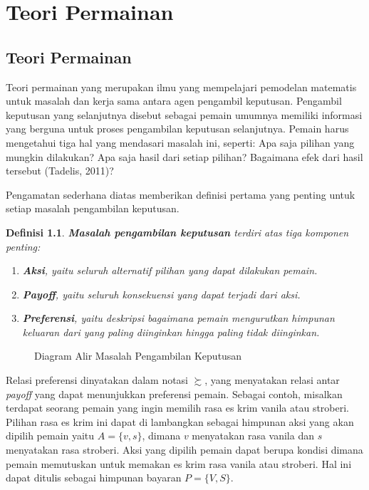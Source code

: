 \newtheorem{definisi}{Definisi}

\chapter{Teori Permainan}
\section{Teori Permainan}
Teori permainan yang merupakan ilmu yang mempelajari pemodelan matematis untuk masalah dan kerja sama antara agen pengambil keputusan. Pengambil keputusan yang selanjutnya disebut sebagai pemain umumnya memiliki informasi yang berguna untuk proses pengambilan keputusan selanjutnya. Pemain harus mengetahui tiga hal yang mendasari masalah ini, seperti: Apa saja pilihan yang mungkin dilakukan? Apa saja hasil dari setiap pilihan? Bagaimana efek dari hasil tersebut (Tadelis, 2011)?

Pengamatan sederhana diatas memberikan definisi pertama yang penting untuk setiap masalah pengambilan keputusan.
\begin{definisi}
    \textbf{Masalah pengambilan keputusan} terdiri atas tiga komponen penting:
    \begin{enumerate}
        \item \textbf{Aksi}, yaitu seluruh alternatif pilihan yang dapat dilakukan pemain.
        \item \textbf{Payoff}, yaitu seluruh konsekuensi yang dapat terjadi dari aksi.
        \item \textbf{Preferensi}, yaitu deskripsi bagaimana pemain mengurutkan himpunan keluaran dari yang paling diinginkan hingga paling tidak diinginkan.
    \end{enumerate}
\end{definisi}

\begin{figure}
    \centering
    
    \caption{Diagram Alir Masalah Pengambilan Keputusan}
\end{figure}
Relasi preferensi dinyatakan dalam notasi $\succsim$, yang menyatakan relasi antar \textit{payoff} yang dapat menunjukkan preferensi pemain. Sebagai contoh, misalkan terdapat seorang pemain yang ingin memilih rasa es krim vanila atau stroberi. Pilihan rasa es krim ini dapat di lambangkan sebagai himpunan aksi yang akan dipilih pemain yaitu  $A = \lbrace v, s\rbrace$, dimana $v$ menyatakan rasa vanila dan $s$ menyatakan rasa stroberi. Aksi yang dipilih pemain dapat berupa kondisi dimana pemain memutuskan untuk memakan es krim rasa vanila atau stroberi. Hal ini dapat ditulis sebagai himpunan bayaran $P = \lbrace V, S\rbrace$.

